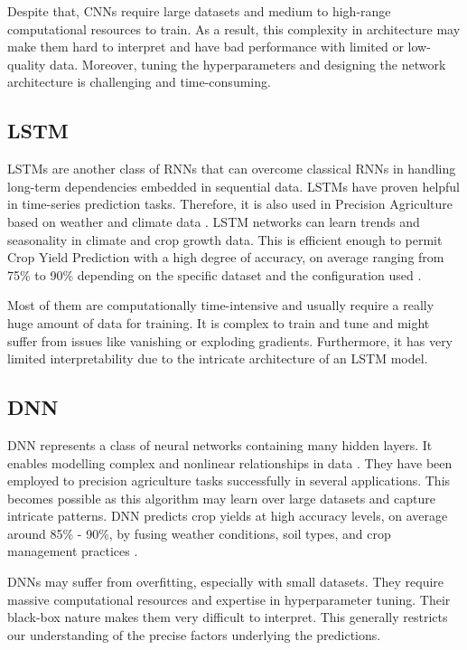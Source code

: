 \documentclass[conference]{IEEEtran}
\begin{document}
Despite that, CNNs require large datasets and medium to high-range computational resources to train. As a result, this complexity in architecture may make them hard to interpret and have bad performance with limited or low-quality data. Moreover, tuning the hyperparameters and designing the network architecture is challenging and time-consuming.

\subsection{LSTM}\label{AA}
LSTMs are another class of RNNs that can overcome classical RNNs in handling long-term dependencies embedded in sequential data. LSTMs have proven helpful in time-series prediction tasks. Therefore, it is also used in Precision Agriculture based on weather and climate data \cite{b39}. LSTM networks can learn trends and seasonality in climate and crop growth data. This is efficient enough to permit Crop Yield Prediction with a high degree of accuracy, on average ranging from 75\% to 90\% depending on the specific dataset and the configuration used \cite{b40}.

Most of them are computationally time-intensive and usually require a really huge amount of data for training. It is complex to train and tune and might suffer from issues like vanishing or exploding gradients. Furthermore, it has very limited interpretability due to the intricate architecture of an LSTM model.

\subsection{DNN}\label{AA}
DNN represents a class of neural networks containing many hidden layers. It enables modelling complex and nonlinear relationships in data \cite{b41}. They have been employed to precision agriculture tasks successfully in several applications. This becomes possible as this algorithm may learn over large datasets and capture intricate patterns. DNN predicts crop yields at high accuracy levels, on average around 85\% - 90\%, by fusing weather conditions, soil types, and crop management practices \cite{b42}.

DNNs may suffer from overfitting, especially with small datasets. They require massive computational resources and expertise in hyperparameter tuning. Their black-box nature makes them very difficult to interpret. This generally restricts our understanding of the precise factors underlying the predictions.
\end{document}
